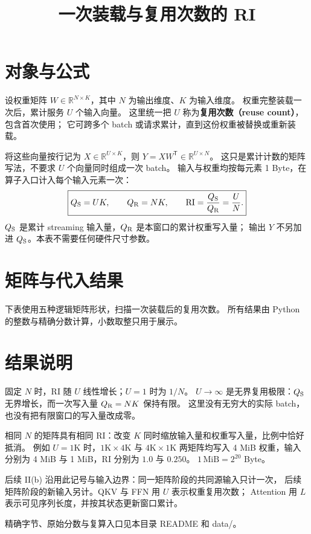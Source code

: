 
\renewcommand{\WorkloadName}{一次装载与复用次数}
\renewcommand{\thetable}{II(a)}
\title{\bfseries 一次装载与复用次数的 RI}

\maketitle

\section{对象与公式}
设权重矩阵 $W\in\mathbb R^{N\times K}$，其中 $N$ 为输出维度、$K$ 为输入维度。
权重完整装载一次后，累计服务 $U$ 个输入向量。
这里统一把 $U$ 称为\textbf{复用次数（reuse count）}，包含首次使用；
它可跨多个 batch 或请求累计，直到这份权重被替换或重新装载。

将这些向量按行记为 $X\in\mathbb R^{U\times K}$，则
$Y=XW^{\mathsf T}\in\mathbb R^{U\times N}$。
这只是累计计数的矩阵写法，不要求 $U$ 个向量同时组成一次 batch。
输入与权重均按每元素 1 Byte，在算子入口计入每个输入元素一次：
\[
\boxed{\displaystyle
Q_{\mathrm S}=UK,\qquad Q_{\mathrm R}=NK,\qquad
\mathrm{RI}=\frac{Q_{\mathrm S}}{Q_{\mathrm R}}=\frac{U}{N}.}
\]
$Q_{\mathrm S}$ 是累计 streaming 输入量，$Q_{\mathrm R}$ 是本窗口的累计权重写入量；
输出 $Y$ 不另加进 $Q_{\mathrm S}$。本表不需要任何硬件尺寸参数。

\section{矩阵与代入结果}
下表使用五种逻辑矩阵形状，扫描一次装载后的复用次数。
所有结果由 Python 的整数与精确分数计算，小数取整只用于展示。


\section{结果说明}
固定 $N$ 时，RI 随 $U$ 线性增长；$U=1$ 时为 $1/N$。
$U\to\infty$ 是无界复用极限：$Q_{\mathrm S}$ 无界增长，而一次写入量 $Q_{\mathrm R}=NK$ 保持有限。
这里没有无穷大的实际 batch，也没有把有限窗口的写入量改成零。

相同 $N$ 的矩阵具有相同 RI：改变 $K$ 同时缩放输入量和权重写入量，比例中恰好抵消。
例如 $U=1\mathrm{K}$ 时，$1\mathrm{K}\times4\mathrm{K}$ 与 $4\mathrm{K}\times1\mathrm{K}$
两矩阵均写入 4 MiB 权重，输入分别为 4 MiB 与 1 MiB，RI 分别为 $1.0$ 与 $0.250$。
$1\,\mathrm{MiB}=2^{20}$ Byte。

后续 II(b) 沿用此记号与输入边界：同一矩阵阶段的共同源输入只计一次，
后续矩阵阶段的新输入另计。QKV 与 FFN 用 $U$ 表示权重复用次数；
Attention 用 $L$ 表示可见序列长度，并按其状态更新窗口累计。

\par\smallskip\noindent\small
精确字节、原始分数与复算入口见本目录 README 和 data/。

